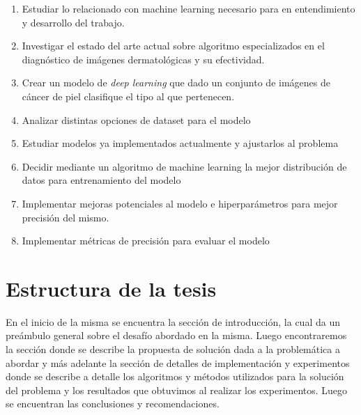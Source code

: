 \begin{enumerate}
    \item Estudiar lo relacionado con machine learning necesario para en entendimiento y desarrollo del trabajo.
    \item Investigar el estado del arte actual sobre algoritmo especializados en el diagnóstico de imágenes dermatológicas y su efectividad.
    \item Crear un modelo de \textit{deep learning} que dado un conjunto de imágenes de cáncer de piel clasifique el tipo al que pertenecen.
        \item Analizar distintas opciones de dataset para el modelo
        \item Estudiar modelos ya implementados actualmente y ajustarlos al problema
        \item Decidir mediante un algoritmo de machine learning la mejor distribución de datos para entrenamiento del modelo
        \item Implementar mejoras potenciales al modelo e hiperparámetros para mejor precisión del mismo.
    \item Implementar métricas de precisión para evaluar el modelo
\end{enumerate}

\section*{Estructura de la tesis}

En el inicio de la misma se encuentra la sección de introducción, la cual da un preámbulo general sobre el desafío abordado en la misma. Luego encontraremos la sección donde se describe la propuesta de solución dada a la problemática a abordar y más adelante la sección de detalles de implementación y experimentos donde se describe a detalle los algoritmos y métodos utilizados para la solución del problema y los resultados que obtuvimos al realizar los experimentos. Luego se encuentran las conclusiones y recomendaciones.